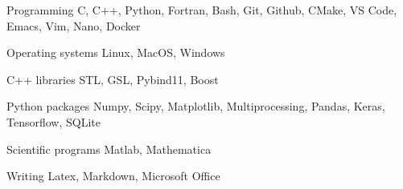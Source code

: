 

\begin{cvskills}

    \cvskill
        {Programming} %
        {C, C++, Python, Fortran, Bash, Git, Github, CMake, VS Code, Emacs, Vim, Nano, Docker} %

    \cvskill
        {Operating systems} %
        {Linux, MacOS, Windows} %

    \cvskill
        {C++ libraries} %
        {STL, GSL, Pybind11, Boost}

    \cvskill
        {Python packages} %
        {Numpy, Scipy, Matplotlib, Multiprocessing, Pandas, Keras, Tensorflow, SQLite}

    \cvskill
        {Scientific programs} %
        {Matlab, Mathematica} %


    \cvskill
        {Writing} %
        {Latex, Markdown, Microsoft Office} %

\end{cvskills}